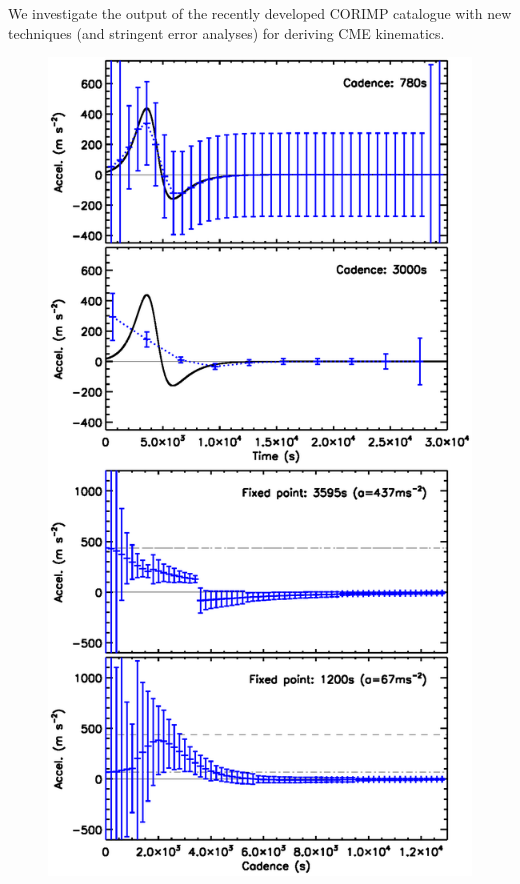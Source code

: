 \documentclass[structabstract]{aa}
\begin{document}
We investigate the output of the recently developed CORIMP catalogue with new techniques (and stringent error analyses) for deriving CME kinematics. %



\begin{figure}[ht]
\centering
{\includegraphics[scale=0.55, trim=15 50 0 40, clip=true]{images/fig_cadence_4.eps}}

\end{figure}
\end{document}

